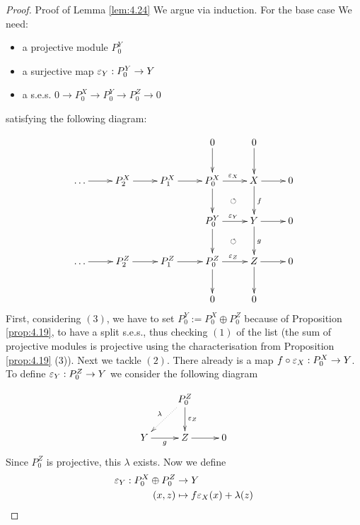 \documentclass[twoside = false,	%
		headsepline,		%
		parskip = true,
		]{scrbook}						%
\begin{document}
    \begin{proof}{Proof of Lemma \ref{lem:4.24}}
        We argue via induction. For the base case  We need:
        \begin{itemize}
            \item a projective module $P_0^Y$
            \item a surjective map $\varepsilon_Y: P_0^Y \to Y$
            \item a s.e.s. $0 \to P_0^X \to P_0^Y \to P_0^Z \to 0$
        \end{itemize}
        satisfying the following diagram:

        \begin{equation*}
        \xymatrix {
            & & & 0 \ar[d] & 0 \ar[d] & \\
            \dots \ar[r] & P_2^X \ar[r] & P_1^X \ar[r] & P_0^X \ar[d] \ar[r]^{\e_X} & X \ar[d]^f \ar[r] & 0 \\
            & & & P_0^Y \ar[d] \ar[r]^{\e_Y} \ar@{}[ur]|{\circlearrowleft} & Y \ar[d]^g \ar[r] & 0 \\
            \dots \ar[r] & P_2^Z \ar[r] & P_1^Z \ar[r] & P_0^Z \ar[d] \ar[r]^{\e_Z}\ar@{}[ur]|{\circlearrowleft} & Z \ar[d] \ar[r] & 0 \\
            & & & 0 & 0
        }
        \end{equation*}
       First, considering $(3)$, we have to set $P_0^Y:=P_0^X \oplus P_0^Z$ because of Proposition \ref{prop:4.19}, to have a split s.e.s., thus checking $(1)$ of the list (the sum of projective modules is projective using the characterisation from Proposition \ref{prop:4.19} (3)).
       Next we tackle $(2)$. There already is a map $f \circ \varepsilon_X: P_0^X \to Y$. To define $\varepsilon_Y: P_0^Z \to Y$ we consider the following diagram

       \begin{equation*}
        \xymatrix {
            & P_0^Z \ar@{.>}[dl]_{\lambda} \ar[d]^{\e_Z} \\
            Y \ar[r]_{g}& Z \ar[r]& 0
        }
       \end{equation*}
       Since $P_0^Z$ is projective, this $\lambda$ exists. Now we define
       \begin{equation*}
        \begin{split}
            \varepsilon_Y: P_0^X \oplus P_0^Z &\to Y \\
            (x,z) &\mapsto f \varepsilon_X(x) + \lambda(z)
        \end{split}
       \end{equation*}


\end{proof}
\end{document}
